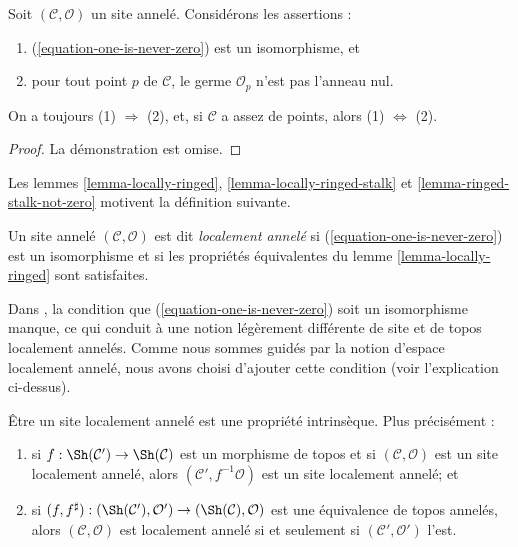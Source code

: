 \begin{lemma}
\label{lemma-ringed-stalk-not-zero}
Soit $(\mathcal{C}, \mathcal{O})$ un site annelé. Considérons les assertions :
\begin{enumerate}
\item (\ref{equation-one-is-never-zero}) est un isomorphisme, et
\item pour tout point $p$ de $\mathcal{C}$, le germe $\mathcal{O}_p$ n'est
pas l'anneau nul.
\end{enumerate}
On a toujours (1) $\Rightarrow$ (2), et, si $\mathcal{C}$ a assez de points,
alors (1) $\Leftrightarrow$ (2).
\end{lemma}

\begin{proof}
La démonstration est omise.
\end{proof}

\noindent
Les lemmes \ref{lemma-locally-ringed},
\ref{lemma-locally-ringed-stalk} et
\ref{lemma-ringed-stalk-not-zero} motivent la définition suivante.

\begin{definition}
\label{definition-locally-ringed}
Un site annelé $(\mathcal{C}, \mathcal{O})$ est dit
{\it localement annelé} si (\ref{equation-one-is-never-zero}) est un
isomorphisme et si les propriétés équivalentes du
lemme \ref{lemma-locally-ringed} sont satisfaites.
\end{definition}

\noindent
Dans \cite[Expos\'e IV, Exercice 13.9]{SGA4}, la condition que
(\ref{equation-one-is-never-zero}) soit un isomorphisme manque, ce qui conduit
à une notion légèrement différente de site et de topos localement annelés.
Comme nous sommes guidés par la notion d'espace localement annelé, nous avons
choisi d'ajouter cette condition (voir l'explication ci-dessus).

\begin{lemma}
\label{lemma-locally-ringed-intrinsic}
Être un site localement annelé est une propriété intrinsèque. Plus précisément :
\begin{enumerate}
\item si $f : \Sh(\mathcal{C}') \to \Sh(\mathcal{C})$ est un morphisme de
topos et si $(\mathcal{C}, \mathcal{O})$ est un site localement annelé, alors
$(\mathcal{C}', f^{-1}\mathcal{O})$ est un site localement annelé; et
\item si
$(f, f^\sharp) : (\Sh(\mathcal{C}'), \mathcal{O}')
\to (\Sh(\mathcal{C}), \mathcal{O})$
est une équivalence de topos annelés, alors $(\mathcal{C}, \mathcal{O})$ est
localement annelé si et seulement si $(\mathcal{C}', \mathcal{O}')$ l'est.
\end{enumerate}
\end{lemma}


